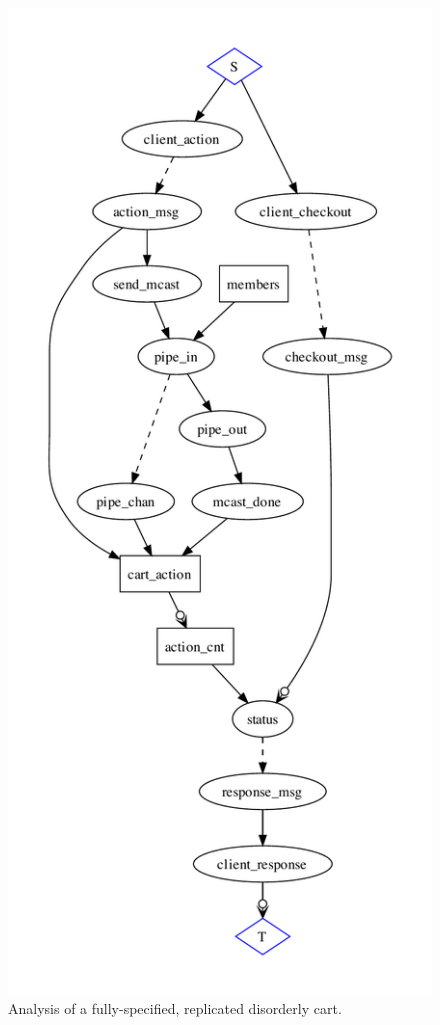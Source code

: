 \begin{figure}[t]
\centering
\includegraphics[width=0.6\linewidth]{fig/disorderly_complete.pdf}
\vspace{-10pt}
\caption{Analysis of a fully-specified, replicated disorderly cart.}
\label{fig:pdg-disorderly-analysis}
\vspace{-2pt}
\end{figure}


